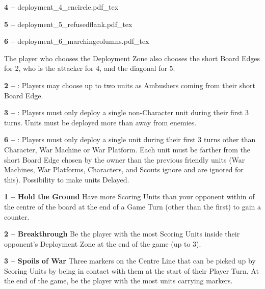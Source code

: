 \documentclass[a4paper,10pt]{article}
\begin{document}
\begin{minipage}[t]{0.70\textwidth}
\begin{minipage}{0.315\textwidth}
\def\deploymentfigAttacker{Attacker}
\def\deploymentfigDefender{Defender}
\textbf{4 -- \encircle{}}\newline
\def\svgwidth{\textwidth}
{deployment_4_encircle.pdf_tex}
\end{minipage}\hfill\begin{minipage}{0.315\textwidth}
\textbf{5 -- }\newline
\def\svgwidth{\textwidth}
{deployment_5_refusedflank.pdf_tex}
\end{minipage}\hfill\begin{minipage}{0.315\textwidth}
\textbf{6 -- \marchingcolumns{}}\newline
\def\svgwidth{\textwidth}
\def\MarchColfontsize{\fontsize{5.5}{7}\selectfont}
{deployment_6_marchingcolumns.pdf_tex}
\end{minipage}

The player who chooses the Deployment Zone also chooses the short Board Edges for 2, who is the attacker for 4, and the diagonal for 5.

\textbf{2 -- \dawnassault{}}: Players may choose up to two units as Ambushers coming from their short Board Edge.

\textbf{3 -- \counterthrust{}}: Players must only deploy a single non-Character unit during their first 3 turns. Units must be deployed more than  away from enemies.

\textbf{6 -- \marchingcolumns{}}: Players must only deploy a single unit during their first 3 turns other than Character, War Machine or War Platform. Each unit must be farther from the short Board Edge chosen by the owner than the previous friendly units (War Machines, War Platforms, Characters, and Scouts ignore and are ignored for this). Possibility to make units Delayed.
\end{minipage}

\vspace*{-5pt}

\begin{minipage}[t]{0.32\textwidth}
\textbf{1 -- Hold the Ground}\newline
Have more Scoring Units than your opponent within  of the centre of the board at the end of a Game Turn (other than the first) to gain a counter.
\end{minipage}\hfill\begin{minipage}[t]{0.32\textwidth}
\textbf{2 -- Breakthrough}\newline
Be the player with the most Scoring Units inside their opponent’s Deployment Zone at the end of the game (up to 3).
\end{minipage}\hfill\begin{minipage}[t]{0.32\textwidth}
\textbf{3 -- Spoils of War}\newline
Three markers on the Centre Line that can be picked up by Scoring Units by being in contact with them at the start of their Player Turn. At the end of the game, be the player with the most units carrying markers.
\end{minipage}
\end{document}
